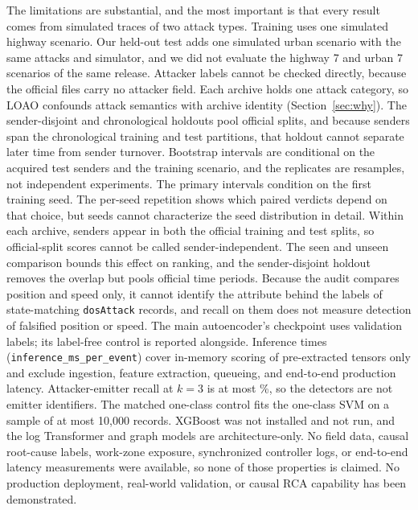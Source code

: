 \documentclass[preprint,12pt,numafflabel]{elsarticle}
\begin{document}
The limitations are substantial, and the most important is that every result comes from simulated traces of two attack types. Training uses one simulated highway scenario. Our held-out test adds one simulated urban scenario with the same attacks and simulator, and we did not evaluate the highway 7 and urban 7 scenarios of the same release. Attacker labels cannot be checked directly, because the official files carry no attacker field. Each archive holds one attack category, so LOAO confounds attack semantics with archive identity (Section~\ref{sec:why}). The sender-disjoint and chronological holdouts pool official splits, and because \ResChronoTrainTestSenderOverlap{} senders span the chronological training and test partitions, that holdout cannot separate later time from sender turnover. Bootstrap intervals are conditional on the acquired test senders and the training scenario, and the replicates are resamples, not independent experiments. The primary intervals condition on the first training seed. The per-seed repetition shows which paired verdicts depend on that choice, but \ResSeeds{} seeds cannot characterize the seed distribution in detail. Within each archive, \ResTrainTestOverlap{} senders appear in both the official training and test splits, so official-split scores cannot be called sender-independent. The seen and unseen comparison bounds this effect on ranking, and the sender-disjoint holdout removes the overlap but pools official time periods. Because the audit compares position and speed only, it cannot identify the attribute behind the labels of state-matching \texttt{dosAttack} records, and recall on them does not measure detection of falsified position or speed. The main autoencoder's checkpoint uses validation labels; its label-free control is reported alongside. Inference times (\texttt{inference\_ms\_per\_event}) cover in-memory scoring of pre-extracted tensors only and exclude ingestion, feature extraction, queueing, and end-to-end production latency. Attacker-emitter recall at $k=3$ is at most \ResMaxRecallThree\%, so the detectors are not emitter identifiers. The matched one-class control fits the one-class SVM on a sample of at most 10,000 records. XGBoost was not installed and not run, and the log Transformer and graph models are architecture-only. No field data, causal root-cause labels, work-zone exposure, synchronized controller logs, or end-to-end latency measurements were available, so none of those properties is claimed. No production deployment, real-world validation, or causal RCA capability has been demonstrated.
\end{document}
